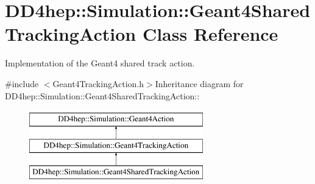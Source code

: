 \hypertarget{class_d_d4hep_1_1_simulation_1_1_geant4_shared_tracking_action}{
\section{DD4hep::Simulation::Geant4SharedTrackingAction Class Reference}
\label{class_d_d4hep_1_1_simulation_1_1_geant4_shared_tracking_action}
}


Implementation of the Geant4 shared track action.  


{\ttfamily \#include $<$Geant4TrackingAction.h$>$}Inheritance diagram for DD4hep::Simulation::Geant4SharedTrackingAction::\begin{figure}[H]
\begin{center}
\leavevmode
\includegraphics[height=3cm]{class_d_d4hep_1_1_simulation_1_1_geant4_shared_tracking_action}
\end{center}
\end{figure}
